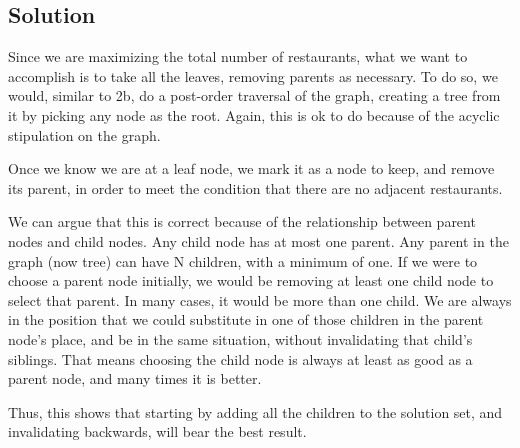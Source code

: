 \subsection*{Solution}

Since we are maximizing the total number of restaurants, what we want to accomplish is to take all the leaves, removing parents as necessary. To do so, we would, similar to 2b, do a post-order traversal of the graph, creating a tree from it by picking any node as the root. Again, this is ok to do because of the acyclic stipulation on the graph.

Once we know we are at a leaf node, we mark it as a node to keep, and remove its parent, in order to meet the condition that there are no adjacent restaurants.

We can argue that this is correct because of the relationship between parent nodes and child nodes. Any child node has at most one parent. Any parent in the graph (now tree) can have N children, with a minimum of one. If we were to choose a parent node initially, we would be removing at least one child node to select that parent. In many cases, it would be more than one child. We are always in the position that we could substitute in one of those children in the parent node's place, and be in the same situation, without invalidating that child's siblings. That means choosing the child node is always at least as good as a parent node, and many times it is better.

Thus, this shows that starting by adding all the children to the solution set, and invalidating backwards, will bear the best result.
